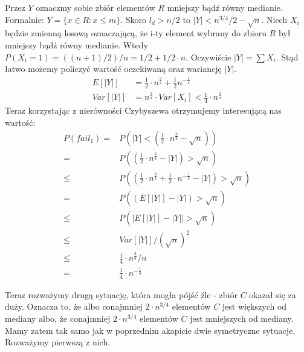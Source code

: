 Przez $Y$ oznaczmy sobie zbiór elementów $R$ mniejszy bądź równy medianie.
Formalnie: $Y = \{ x \in R: x \leq m\}$.
Skoro $l_d> n/2$ to $|Y| < n^{3/4}/2 - \sqrt{n}$.
Niech $X_i$ będzie zmienną losową oznaczającą, że i-ty element wybrany do zbioru $R$ był mniejszy bądź równy medianie.
Wtedy $P(X_i = 1) = ((n+1)/2)/n = 1/2 + 1/2\cdot n$.
Oczywiście $|Y| = \sum X_i$.
Stąd łatwo możemy policzyć wartość oczekiwaną oraz wariancję $|Y|$.
\begin{align*} 
 E[|Y|] & = \frac{1}{2} \cdot n^{\frac{3}{4}} + \frac{1}{2}n^{-\frac{1}{4}} \\
 Var[|Y|] & = n^{\frac{3}{4}} \cdot Var[X_i] < \frac{1}{4} \cdot n^{\frac{3}{4}}
\end{align*}
Teraz korzystając z nierówności Czybyszewa otrzymujemy interesującą nas wartość:
\begin{align*}
 P\left(fail_1\right) = & P\left(|Y| < \left(\frac{1}{2} \cdot n^{\frac{3}{4}} - \sqrt{n}\right)\right) \\
                      = & P\left(\left(\frac{1}{2} \cdot n^{\frac{3}{4}} - |Y|\right) > \sqrt{n}\right) \\
                      \leq & P\left(\left(\frac{1}{2} \cdot n^{\frac{3}{4}} + \frac{1}{2} \cdot n^{-\frac{1}{4}} - |Y|\right) > \sqrt{n}\right) \\
                      = & P\left(\left(E[|Y|] - |Y|\right) > \sqrt{n}\right)\\
                      \leq & P\left(|E[|Y|] -|Y| | > \sqrt{n}\right) \\
                      \leq & Var[|Y|] / (\sqrt{n})^2 \\
                      \leq & \frac{1}{4} \cdot n^{\frac{3}{4}} / n \\
                      = & \frac{1}{4} \cdot n^{-\frac{1}{4}}
\end{align*}

Teraz rozważymy drugą sytuację, która mogła pójść źle - zbiór $C$ okazał się za duży.
Oznacza to, że albo conajmniej $2 \cdot n^{3/4}$ elementów $C$ jest większych od mediany albo, że conajmniej $2 \cdot n^{3/4}$ elementów $C$ jest mniejszych od mediany.
Mamy zatem tak samo jak w poprzednim akapicie dwie symetryczne sytuacje.
Rozważymy pierwszą z nich.

